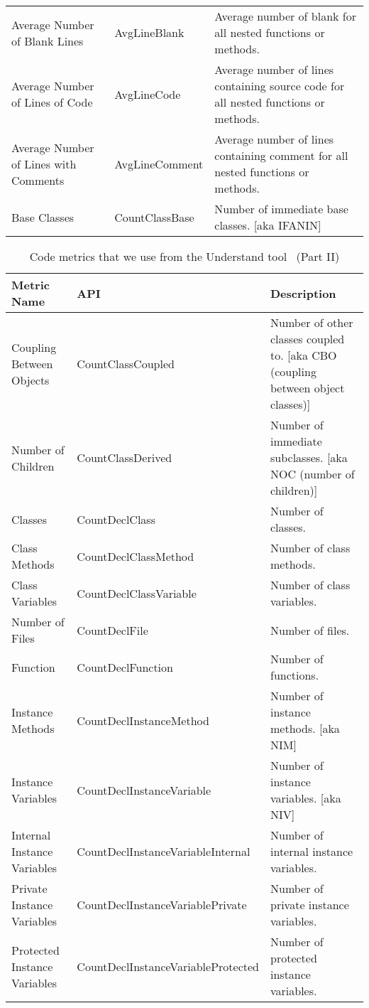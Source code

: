 \begin{table}
\begin{tabular}{p{}p{}p{}}
		Average Number of Blank Lines & AvgLineBlank & Average number of blank for all nested functions or methods.\\
		Average Number of Lines of Code & AvgLineCode & Average number of lines containing source code for all nested functions or methods.\\
		Average Number of Lines with Comments & AvgLineComment & Average number of lines containing comment for all nested functions or methods.\\
		Base Classes & CountClassBase & Number of immediate base classes. [aka IFANIN]\\
	\end{tabular}
\end{table}

\begin{table}
	\centering
	\scriptsize
	\caption{Code metrics that we use from the Understand tool~\cite{understand} (Part II)\label{table:code_metrics2}}
	\begin{tabular}{p{}p{}p{}}
		\hline
		{\bfseries Metric Name} & {\bfseries API} & {\bfseries Description}\\
		\hline
		Coupling Between Objects & CountClassCoupled & Number of other classes coupled to. [aka CBO (coupling between object classes)]\\
		Number of Children & CountClassDerived & Number of immediate subclasses. [aka NOC (number of children)]\\
		Classes & CountDeclClass & Number of classes.\\
		Class Methods & CountDeclClassMethod & Number of class methods.\\
		Class Variables & CountDeclClassVariable & Number of class variables.\\
		Number of Files & CountDeclFile & Number of files.\\
		Function & CountDeclFunction & Number of functions.\\
		Instance Methods & CountDeclInstanceMethod & Number of instance methods. [aka NIM]\\
		Instance Variables & CountDeclInstanceVariable & Number of instance variables. [aka NIV]\\
		Internal Instance Variables & CountDeclInstanceVariable\-Internal & Number of internal instance variables.\\
		Private Instance Variables & CountDeclInstanceVariable\-Private & Number of private instance variables.\\
		Protected Instance Variables & CountDeclInstanceVariable\-Protected & Number of protected instance variables.\\

\end{tabular}
\end{table}
